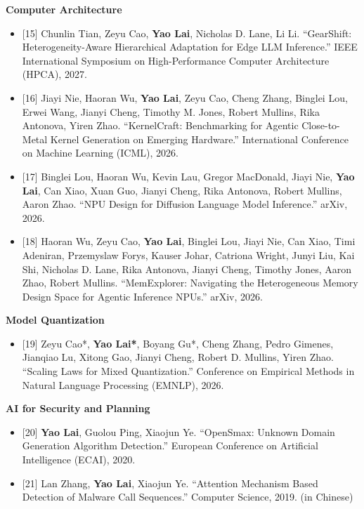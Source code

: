 \documentclass{article}
\newcommand{\resumeItemListStart}{\begin{itemize}[topsep=2pt]}
\newcommand{\resumeItemListEnd}{\end{itemize}\vspace{-5pt}}
\newif\ifshowCCF
\newcommand{\ccf}[1]{%
  \ifshowCCF
    \ifnum\pdfstrcmp{#1}{A}=0
      \resumetag{\textbf{CCF-#1}}%
    \else
      \resumetaggray{\textbf{CCF-#1}}%
    \fi
  \fi
}
\begin{document}
    \vspace{3pt}
    \item{\textbf{Computer Architecture}}
    \resumeItemListStart
      \item{[15] Chunlin Tian, Zeyu Cao, \textbf{Yao Lai}, Nicholas D. Lane, Li Li. ``GearShift: Heterogeneity-Aware Hierarchical Adaptation for Edge LLM Inference.'' IEEE International Symposium on High-Performance Computer Architecture (HPCA), 2027. \ccf{A}}
      \item{[16] Jiayi Nie, Haoran Wu, \textbf{Yao Lai}, Zeyu Cao, Cheng Zhang, Binglei Lou, Erwei Wang, Jianyi Cheng, Timothy M. Jones, Robert Mullins, Rika Antonova, Yiren Zhao. ``KernelCraft: Benchmarking for Agentic Close-to-Metal Kernel Generation on Emerging Hardware.'' International Conference on Machine Learning (ICML), 2026. \ccf{A}}
      \item{[17] Binglei Lou, Haoran Wu, Kevin Lau, Gregor MacDonald, Jiayi Nie, \textbf{Yao Lai}, Can Xiao, Xuan Guo, Jianyi Cheng, Rika Antonova, Robert Mullins, Aaron Zhao. ``NPU Design for Diffusion Language Model Inference.'' arXiv, 2026.}
      \item{[18] Haoran Wu, Zeyu Cao, \textbf{Yao Lai}, Binglei Lou, Jiayi Nie, Can Xiao, Timi Adeniran, Przemyslaw Forys, Kauser Johar, Catriona Wright, Junyi Liu, Kai Shi, Nicholas D. Lane, Rika Antonova, Jianyi Cheng, Timothy Jones, Aaron Zhao, Robert Mullins. ``MemExplorer: Navigating the Heterogeneous Memory Design Space for Agentic Inference NPUs.'' arXiv, 2026.}
    \resumeItemListEnd

    \vspace{3pt}
    \item{\textbf{Model Quantization}}
    \resumeItemListStart
      \item{[19] Zeyu Cao*, \textbf{Yao Lai*}, Boyang Gu*, Cheng Zhang, Pedro Gimenes, Jianqiao Lu, Xitong Gao, Jianyi Cheng, Robert D. Mullins, Yiren Zhao. ``Scaling Laws for Mixed Quantization.'' Conference on Empirical Methods in Natural Language Processing (EMNLP), 2026. \ccf{B}}
    \resumeItemListEnd

    \vspace{3pt}
    \item{\textbf{AI for Security and Planning}}
    \resumeItemListStart
      \item{[20] \textbf{Yao Lai}, Guolou Ping, Xiaojun Ye. ``OpenSmax: Unknown Domain Generation Algorithm Detection.'' European Conference on Artificial Intelligence (ECAI), 2020. \ccf{B}}
      \item{[21] Lan Zhang, \textbf{Yao Lai}, Xiaojun Ye. ``Attention Mechanism Based Detection of Malware Call Sequences.'' Computer Science, 2019. (in Chinese)}    \resumeItemListEnd
\end{document}
